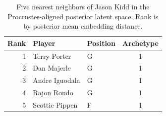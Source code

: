 \begin{table}[htbp]
  \centering\small
  \begin{tabular}{rllc}
    \toprule
    Rank & Player & Position & Archetype \\
    \midrule
    1 & Terry Porter & G & 1 \\
    2 & Dan Majerle & G & 1 \\
    3 & Andre Iguodala & G & 1 \\
    4 & Rajon Rondo & G & 1 \\
    5 & Scottie Pippen & F & 1 \\
    \bottomrule
  \end{tabular}
  \caption{Five nearest neighbors of Jason Kidd in the Procrustes-aligned posterior latent space. Rank is by posterior mean embedding distance.}
  \label{tab:Jason_Kidd_neighbors}
\end{table}

